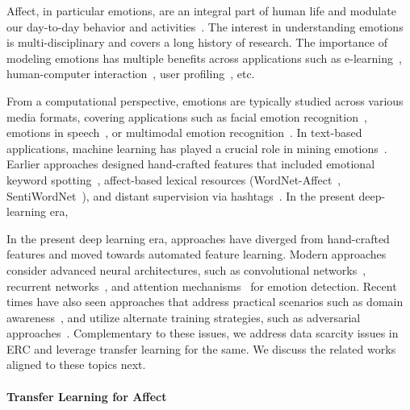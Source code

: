 \documentclass[preprint,3pt]{elsarticle}
\begin{document}
Affect, in particular emotions, are an integral part of human life and modulate our day-to-day behavior and activities~\cite{DBLP:journals/cim/CambriaPHL19}. The interest in understanding emotions is multi-disciplinary and covers a long history of research. The importance of modeling emotions has multiple benefits across applications such as e-learning~\cite{DBLP:journals/jnca/ImaniM19}, human-computer interaction~\cite{DBLP:conf/interspeech/LiscombeRH05}, user profiling~\cite{DBLP:series/lncs/SchiaffinoA09}, etc.

From a computational perspective, emotions are typically studied across various media formats, covering applications such as facial emotion recognition~\cite{DBLP:journals/corr/abs-1804-08348,DBLP:journals/ijon/WangPDZ18}, emotions in speech~\cite{DBLP:conf/webist/DrakopoulosPSP19,DBLP:journals/air/AnagnostopoulosIG15}, or multimodal emotion recognition~\cite{DBLP:series/lncs/MarechalMTPBAW19}. In text-based applications, machine learning has played a crucial role in mining emotions~\cite{DBLP:conf/naacl/AlmRS05}. Earlier approaches designed hand-crafted features that included emotional keyword spotting~\cite{DBLP:conf/sac/StrapparavaM08}, affect-based lexical resources (WordNet-Affect~\cite{DBLP:conf/lrec/StrapparavaV04}, SentiWordNet~\cite{DBLP:conf/lrec/Esuli006}), and distant supervision via hashtags~\cite{DBLP:conf/socialcom/0002CTS12}. In the present deep-learning era, 

In the present deep learning era, approaches have diverged from hand-crafted features and moved towards automated feature learning. Modern approaches consider advanced neural architectures, such as convolutional networks~\cite{choi-etal-2018-convolutional}, recurrent networks~\cite{DBLP:journals/corr/ChernykhSP17}, and attention mechanisms~\cite{DBLP:conf/icassp/MirsamadiBZ17} for emotion detection. Recent times have also seen approaches that address practical scenarios such as domain awareness~\cite{DBLP:journals/cim/Dragoni19}, and utilize alternate training strategies, such as adversarial approaches~\cite{DBLP:journals/cim/HanZS19}. Complementary to these issues, we address data scarcity issues in ERC and leverage transfer learning for the same. We discuss the related works aligned to these topics next.


\paragraph{Transfer Learning for Affect}
\end{document}
